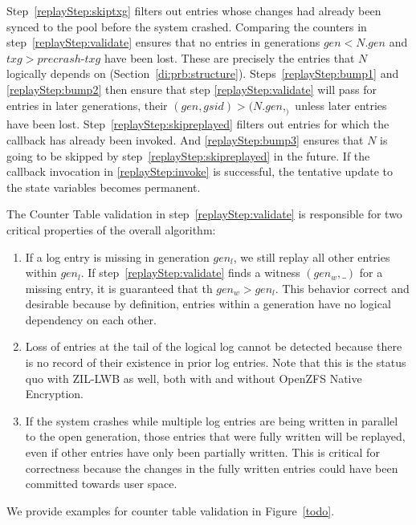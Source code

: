 \documentclass[12pt,a4paper,twoside]{book}
\begin{document}
Step~\ref{replayStep:skiptxg} filters out entries whose changes had already been synced to the pool before the system crashed.
Comparing the counters in step~\ref{replayStep:validate} ensures that no entries in generations $gen < N.gen$ and $txg > precrash\text{-}txg$ have been lost.
These are precisely the entries that $N$ logically depends on (Section~\ref{di:prb:structure}).
Steps~\ref{replayStep:bump1} and \ref{replayStep:bump2} then ensure that step \ref{replayStep:validate} will pass for entries in later generations, their $(gen, gsid) > (N.gen, _)$ unless later entries have been lost.
Step~\ref{replayStep:skipreplayed} filters out entries for which the callback has already been invoked.
And \ref{replayStep:bump3} ensures that $N$ is going to be skipped by step~\ref{replayStep:skipreplayed} in the future.
If the callback invocation in \ref{replayStep:invoke} is successful, the tentative update to the state variables becomes permanent.

The Counter Table validation in step~\ref{replayStep:validate} is responsible for two critical properties of the overall algorithm:
\begin{enumerate}[noitemsep]
    \item If a log entry is missing in generation $gen_l$, we still replay all other entries within $gen_l$.
        If step~\ref{replayStep:validate} finds a witness $(gen_w, \_)$ for a missing entry, it is guaranteed that th $gen_w > gen_l$.
        This behavior correct and desirable because by definition, entries within a generation have no logical dependency on each other.
    \item Loss of entries at the tail of the logical log cannot be detected because there is no record of their existence in prior log entries.
        Note that this is the status quo with ZIL-LWB as well, both with and without OpenZFS Native Encryption.
    \item If the system crashes while multiple log entries are being written in parallel to the open generation, those entries that were fully written will be replayed, even if other entries have only been partially written.
        This is critical for correctness because the changes in the fully written entries could have been committed towards user space.
\end{enumerate}
We provide examples for counter table validation in Figure~\ref{todo}.
\end{document}
